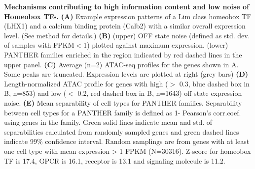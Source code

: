 \textbf{Mechanisms contributing to high information content and low noise of Homeobox TFs.}
\textbf{(A)} Example expression patterns of a Lim class homeobox TF (LHX1) and a calcium binding protein (Calb2) with a similar overall expression level. 
(See method for details.)
\textbf{(B)} (upper) OFF state noise (defined as std. dev. of samples with FPKM$<$1) plotted against maximum expression. (lower) PANTHER families enriched in the region indicated by red dashed lines in the upper panel.
\textbf{(C)} Average (n=2) ATAC-seq profiles for the genes shown in A. Some peaks are truncated. Expression levels are plotted at right (grey bars)
\textbf{(D)} Length-normalized ATAC profile for genes with high ($>$ 0.3, blue dashed box in B, n=853) and low ($<$ 0.2, red dashed box in B, n=1643) off state expression noise.
\textbf{(E)} Mean separability of cell types for PANTHER families. Separability between cell types for a PANTHER family is defined as 1- Pearson's corr.coef. using genes in the family. Green solid lines indicate mean and std. of separabilities calculated from randomly sampled genes and green dashed lines indicate 99\% confidence interval. Random samplings are from genes with at least one cell type with mean expression > 1 FPKM (N=30316). Z-score for homeobox TF is 17.4, GPCR is 16.1, receptor is 13.1 and signaling molecule is 11.2. 
